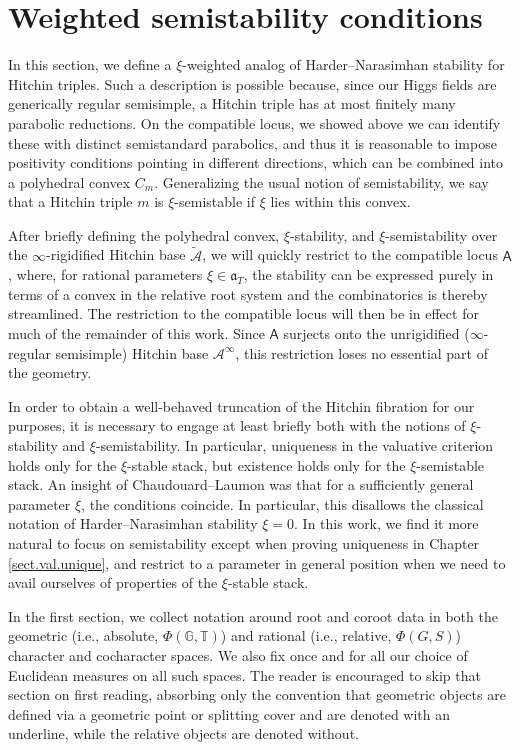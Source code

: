\documentclass[openany]{amsbook}
\theoremstyle{definition}
\theoremstyle{remark}
\numberwithin{equation}{section}
\newcommand{\G}{\mathbb{G}}
\newcommand{\T}{\mathbb{T}}
\newcommand{\cA}{\mathcal{A}}
\renewcommand{\-}{\operatorname{-}}
\renewcommand{\a}{\mathfrak{a}}
\newcommand{\ctA}{\widetilde{\cA}}
\newcommand{\bA}{\mathsf{A}}
\begin{document}
\chapter{Weighted semistability conditions}\label{sect.weighted.stab}

In this section, we define a $\xi$-weighted analog of Harder--Narasimhan stability for Hitchin triples. Such a description is possible because, since our Higgs fields are generically regular semisimple, a Hitchin triple has at most finitely many parabolic reductions. On the compatible locus, we showed above we can identify these with distinct semistandard parabolics, and thus it is reasonable to impose positivity conditions pointing in different directions, which can be combined into a polyhedral convex $C_m$. Generalizing the usual notion of semistability, we say that a Hitchin triple $m$ is $\xi$-semistable if $\xi$ lies within this convex.

After briefly defining the polyhedral convex, $\xi$-stability, and $\xi$-semistability over the $\infty$-rigidified Hitchin base $\ctA$, we will quickly restrict to the compatible locus $\bA$, where, for rational parameters $\xi \in \a_T$, the stability can be expressed purely in terms of a convex in the relative root system and the combinatorics is thereby streamlined. The restriction to the compatible locus will then be in effect for much of the remainder of this work. Since $\bA$ surjects onto the unrigidified ($\infty$-regular semisimple) Hitchin base $\cA^{\infty}$, this restriction loses no essential part of the geometry. 

In order to obtain a well-behaved truncation of the Hitchin fibration for our purposes, it is necessary to engage at least briefly both with the notions of $\xi$-stability and $\xi$-semistability. In particular, uniqueness in the valuative criterion holds only for the $\xi$-stable stack, but existence holds only for the $\xi$-semistable stack. An insight of Chaudouard--Laumon was that for a sufficiently general parameter $\xi$, the conditions coincide. In particular, this disallows the classical notation of Harder--Narasimhan stability $\xi = 0$. In this work, we find it more natural to focus on semistability except when proving uniqueness in Chapter \ref{sect.val.unique}, and restrict to a parameter in general position when we need to avail ourselves of properties of the $\xi$-stable stack.

In the first section, we collect notation around root and coroot data in both the geometric (i.e., absolute, $\Phi(\G, \T)$) and rational (i.e., relative, $\Phi(G, S)$) character and cocharacter spaces. We also fix once and for all our choice of Euclidean measures on all such spaces. The reader is encouraged to skip that section on first reading, absorbing only the convention that geometric objects are defined via a geometric point or splitting cover and are denoted with an underline, while the relative objects are denoted without.
\end{document}
